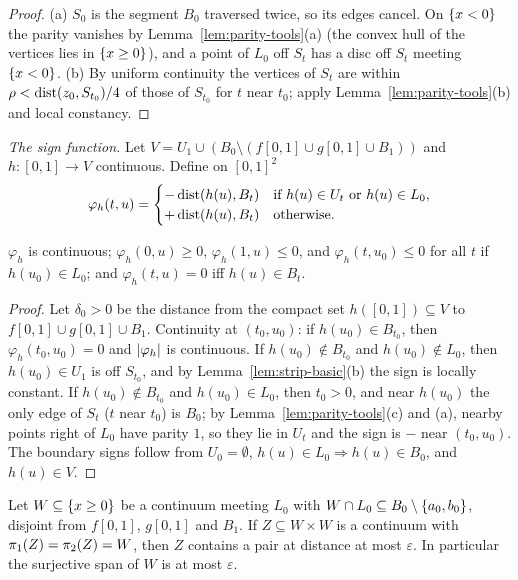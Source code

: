 \begin{proof}
(a) $S_0$ is the segment $B_0$ traversed twice, so its edges cancel. On $\left\{ x<0 \right\}$ the parity vanishes by Lemma~\ref{lem:parity-tools}(a) (the convex hull of
the vertices lies in $\left\{ x\ge0 \right\}$), and a point of $L_0$ off $S_t$ has a disc off $S_t$ meeting $\left\{ x<0 \right\}$. (b) By uniform continuity the vertices of $S_t$ are
within $\rho<\operatorname{dist}(z_0,S_{t_0})/4$ of those of $S_{t_0}$ for $t$ near $t_0$; apply Lemma~\ref{lem:parity-tools}(b) and local constancy.
\end{proof}


\emph{The sign function.} Let $V=U_1\cup(B_0\setminus(f[0,1]\cup g[0,1]\cup B_1))$ and $h\colon[0,1]\to V$ continuous. Define on $[0,1]^2$
\[
\varphi_h(t,u)=\begin{cases}-\operatorname{dist}(h(u),B_t)&\text{if }h(u)\in U_t\text{ or }h(u)\in L_0,\\ +\operatorname{dist}(h(u),B_t)&\text{otherwise.}\end{cases}
\]


\begin{lemma}\label{lem:sign}
$\varphi_h$ is continuous; $\varphi_h(0,u)\ge0$, $\varphi_h(1,u)\le0$, and $\varphi_h(t,u_0)\le0$ for all $t$ if $h(u_0)\in L_0$; and $\varphi_h(t,u)=0$ iff $h(u)\in B_t$.
\end{lemma}

\begin{proof}
Let $\delta_0>0$ be the distance from the compact set $h([0,1])\subseteq V$ to $f[0,1]\cup g[0,1]\cup B_1$. Continuity at $(t_0,u_0)$: if $h(u_0)\in B_{t_0}$, then
$\varphi_h(t_0,u_0)=0$ and $\left\lvert \varphi_h\right\rvert$ is continuous. If $h(u_0)\notin B_{t_0}$ and $h(u_0)\notin L_0$, then $h(u_0)\in U_1$ is off $S_{t_0}$, and by
Lemma~\ref{lem:strip-basic}(b) the sign is locally constant. If $h(u_0)\notin B_{t_0}$ and $h(u_0)\in L_0$, then $t_0>0$, and near $h(u_0)$ the only edge of $S_t$
($t$ near $t_0$) is $B_0$; by Lemma~\ref{lem:parity-tools}(c) and (a), nearby points right of $L_0$ have parity $1$, so they lie in $U_t$ and the sign is $-$ near
$(t_0,u_0)$. The boundary signs follow from $U_0=\emptyset$, $h(u)\in L_0\Rightarrow h(u)\in B_0$, and $h(u)\in V$.
\end{proof}

\begin{theorem}\label{thm:strip-lemma}
Let $W\subseteq\left\{ x\ge0 \right\}$ be a continuum meeting $L_0$ with $W\cap L_0\subseteq B_0\setminus\left\{ a_0,b_0 \right\}$, disjoint from $f[0,1]$, $g[0,1]$ and $B_1$. If $Z\subseteq W\times W$ is a
continuum with $\pi_{1}(Z)=\pi_{2}(Z)=W$, then $Z$ contains a pair at distance at most $\varepsilon$. In particular the surjective span of $W$ is at most $\varepsilon$.
\end{theorem}

